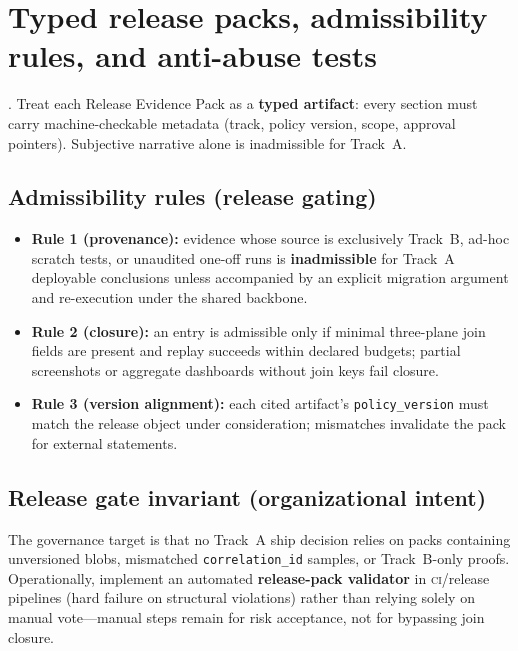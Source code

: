 \documentclass[11pt,a4paper]{report}
\begin{document}
\section{Typed release packs, admissibility rules, and anti-abuse tests}
\EvalFramework{}. Treat each Release Evidence Pack as a \textbf{typed artifact}: every section must carry machine-checkable metadata (track, policy version, scope, approval pointers). Subjective narrative alone is inadmissible for Track~A.

\subsection{Admissibility rules (release gating)}
\begin{itemize}
  \item \textbf{Rule 1 (provenance):} evidence whose source is exclusively Track~B, ad-hoc scratch tests, or unaudited one-off runs is \textbf{inadmissible} for Track~A deployable conclusions unless accompanied by an explicit migration argument and re-execution under the shared backbone.
  \item \textbf{Rule 2 (closure):} an entry is admissible only if minimal three-plane join fields are present and replay succeeds within declared budgets; partial screenshots or aggregate dashboards without join keys fail closure.
  \item \textbf{Rule 3 (version alignment):} each cited artifact’s \texttt{policy\_version} must match the release object under consideration; mismatches invalidate the pack for external statements.
\end{itemize}

\subsection{Release gate invariant (organizational intent)}
The governance target is that no Track~A ship decision relies on packs containing unversioned blobs, mismatched \texttt{correlation\_id} samples, or Track~B-only proofs. Operationally, implement an automated \textbf{release-pack validator} in \textsc{ci}/release pipelines (hard failure on structural violations) rather than relying solely on manual vote---manual steps remain for risk acceptance, not for bypassing join closure.
\end{document}
